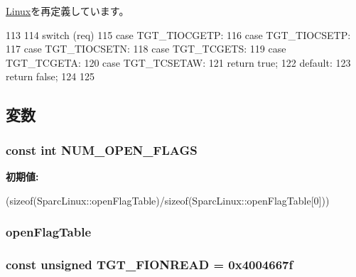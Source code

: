 \hyperlink{classLinux_ab20bdd4422ecf6e1736a5587be296b3f}{Linux}を再定義しています。


\begin{DoxyCode}
113     {
114         switch (req) {
115           case TGT_TIOCGETP:
116           case TGT_TIOCSETP:
117           case TGT_TIOCSETN:
118           case TGT_TCGETS:
119           case TGT_TCGETA:
120           case TGT_TCSETAW:
121             return true;
122           default:
123             return false;
124         }
125     }
\end{DoxyCode}


\subsection{変数}
\hypertarget{classSparcLinux_ad85b9918c8f2c8739537a002dc1dc526}{
\subsubsection[{NUM\_\-OPEN\_\-FLAGS}]{\setlength{\rightskip}{0pt plus 5cm}const int {\bf NUM\_\-OPEN\_\-FLAGS}}}
\label{classSparcLinux_ad85b9918c8f2c8739537a002dc1dc526}
{\bfseries 初期値:}
\begin{DoxyCode}

        (sizeof(SparcLinux::openFlagTable)/sizeof(SparcLinux::openFlagTable[0]))
\end{DoxyCode}
\hypertarget{classSparcLinux_ab1db5a531609b99b262cc849ea24765a}{
\subsubsection[{openFlagTable}]{ {\bf openFlagTable}}}
\label{classSparcLinux_ab1db5a531609b99b262cc849ea24765a}
\hypertarget{classSparcLinux_a1def346ff527c8efccfd52463f3b5dc1}{
\subsubsection[{TGT\_\-FIONREAD}]{\setlength{\rightskip}{0pt plus 5cm}const unsigned {\bf TGT\_\-FIONREAD} = 0x4004667f}}
\label{classSparcLinux_a1def346ff527c8efccfd52463f3b5dc1}


